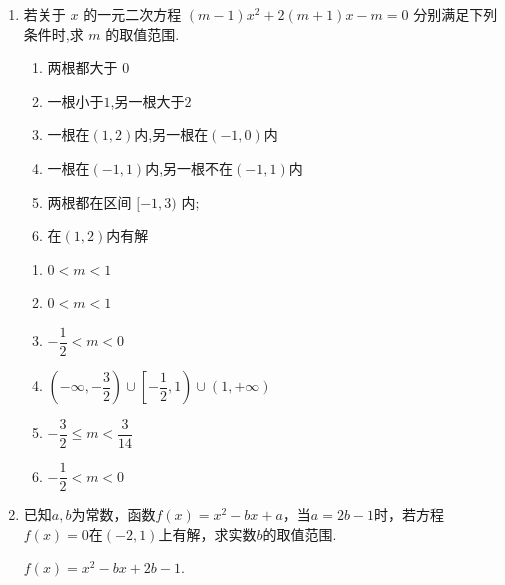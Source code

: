 \begin{enumerate}
\begin{enumerate}
        \item 若关于 $x$ 的一元二次方程 $\left( {m - 1}\right) {x}^{2} + 2\left( {m + 1}\right) x - m = 0$ 分别满足下列条件时,求 $m$ 的取值范围.
        \begin{enumerate}
            \item 两根都大于 $0$
            \item 一根小于$1$,另一根大于$2$
            \item 一根在$(1,2)$内,另一根在$(-1,0)$内
            \item 一根在$(-1,1)$内,另一根不在$(-1,1)$内
            \item 两根都在区间 $[-1,3)$ 内;
            \item 在$(1,2)$内有解
        \end{enumerate}
        \begin{jieda}
            \begin{enumerate}
                \item $0 < m < 1$
                \item $0 < m < 1$
                \item $- \dfrac{1}{2} < m < 0$
                \item $\left( {-\infty , - \dfrac{3}{2}}\right)  \cup  \left[  {-\dfrac{1}{2},1}\right)  \cup  \left( {1, + \infty }\right)$
                \item $- \dfrac{3}{2} \leq  m < \dfrac{3}{14}$
                \item $- \dfrac{1}{2} < m < 0$
            \end{enumerate}
        \end{jieda}
        \item 已知$a, b$为常数，函数$f(x) = x^2 - bx + a$，当$a = 2b-1$时，若方程$f(x) = 0$在$(-2, 1)$上有解，求实数$b$的取值范围.
        \begin{jieda}
            $f(x) = x^2 - bx + 2b - 1$.
\end{jieda}
\end{enumerate}
\end{enumerate}
